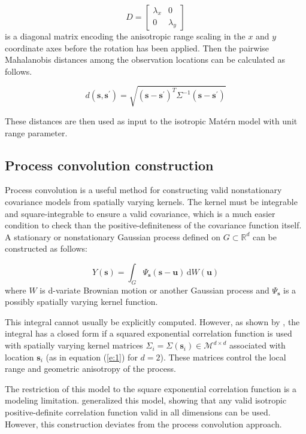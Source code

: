 \documentclass[review]{elsarticle}
\begin{document}
$$D = \begin{bmatrix} \lambda_x & 0 \\ 0 & \lambda_y \end{bmatrix} $$ 
is a diagonal matrix encoding the anisotropic range scaling in the $x$ and $y$ coordinate axes before the rotation has been applied. Then the pairwise Mahalanobis distances among the observation locations can be calculated as follows.

$$ d(\mathbf s, \mathbf s^\prime ) = \sqrt{(\mathbf s - \mathbf s^\prime)^T \Sigma^{-1} (\mathbf s - \mathbf s^\prime)}$$

These distances are then used as input to the isotropic Mat\'ern model with unit range parameter. 


\subsection{Process convolution construction}

Process convolution is a useful method for constructing valid nonstationary covariance models from spatially varying kernels. The kernel must be integrable and square-integrable to ensure a valid covariance, which is a much easier condition to check than the positive-definiteness of the covariance function itself. A stationary or nonstationary Gaussian process defined on $G \subset \mathbb{R}^d$ can be constructed as follows:

$$ Y(\mathbf s) = \int_{G} \Psi_{\mathbf{s}}(\mathbf s - \mathbf u) \, \mathrm d W(\mathbf u ) $$ where $W$ is d-variate Brownian motion or another Gaussian process and $\Psi_{\mathbf{s}}$ is a possibly spatially varying kernel function. 

This integral cannot usually be explicitly computed. However, as shown by \citet{higdon1998process}, the integral has a closed form if a squared exponential correlation function is used with spatially varying kernel matrices $\Sigma_i = \Sigma(\mathbf s_i) \in \mathcal{M}^{d \times d}$ associated with location $\mathbf s_i$ (as in equation (\ref{e:1}) for $d=2$). These matrices control the local range and geometric anisotropy of the process.  

The restriction of this model to the square exponential correlation function is a modeling limitation. \citet{paciorek2004nonstationary} generalized this model, showing that any valid isotropic positive-definite correlation function valid in all dimensions can be used. However, this construction deviates from the process convolution approach.
\end{document}
